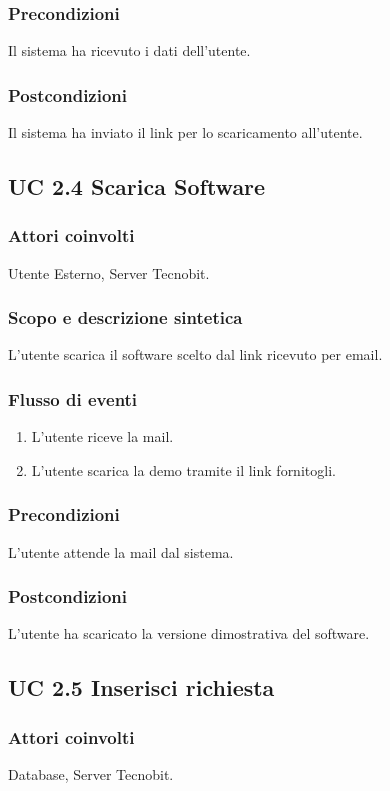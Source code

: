 \subsubsection*{Precondizioni} Il sistema ha ricevuto i dati dell'utente.
\subsubsection*{Postcondizioni} Il sistema ha inviato il link per lo scaricamento all'utente.

\subsection*{UC 2.4 Scarica Software}
\subsubsection*{Attori coinvolti} Utente Esterno, Server Tecnobit.
\subsubsection*{Scopo e descrizione sintetica}
L'utente scarica il software scelto dal link ricevuto per email.
\subsubsection*{Flusso di eventi}
\begin{enumerate}
\item L'utente riceve la mail.
\item L'utente scarica la demo tramite il link fornitogli.
\end{enumerate}
\subsubsection*{Precondizioni} L'utente attende la mail dal sistema.
\subsubsection*{Postcondizioni} L'utente ha scaricato la versione dimostrativa del software.

\subsection*{UC 2.5 Inserisci richiesta}
\subsubsection*{Attori coinvolti}  
Database, Server Tecnobit. 
